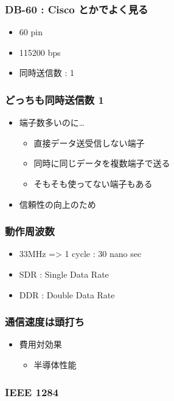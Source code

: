 \documentclass{jsarticle}
\begin{document}
\subsubsection{DB-60 : Cisco とかでよく見る}

\begin{itemize}
\item
  60 pin
\item
  115200 bps
\item
  同時送信数 : 1
\end{itemize}
\subsubsection{どっちも同時送信数 1}

\begin{itemize}
\item
  端子数多いのに\ldots{}
  \begin{itemize}
  \item
    直接データ送受信しない端子
  \item
    同時に同じデータを複数端子で送る
  \item
    そもそも使ってない端子もある
  \end{itemize}
\item
  信頼性の向上のため
\end{itemize}
\subsubsection{動作周波数}

\begin{itemize}
\item
  33MHz =\textgreater{} 1 cycle : 30 nano sec
\item
  SDR : Single Data Rate
\item
  DDR : Double Data Rate
\end{itemize}
\subsubsection{通信速度は頭打ち}

\begin{itemize}
\item
  費用対効果
  \begin{itemize}
  \item
    半導体性能
  \end{itemize}
\end{itemize}
\subsubsection{IEEE 1284}
\end{document}
